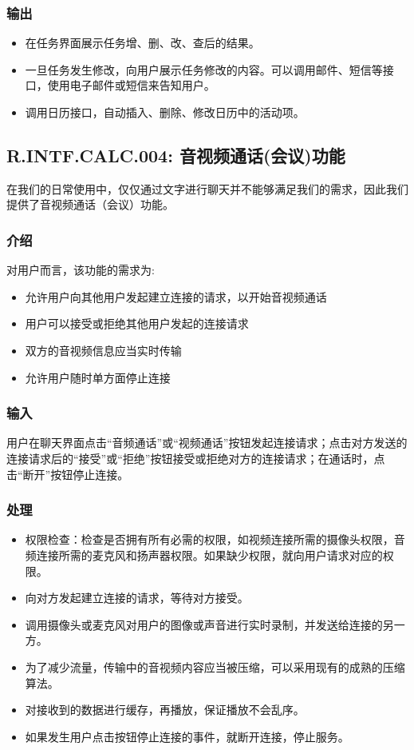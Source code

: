 \subsubsection{输出}
\begin{itemize}
  \item 在任务界面展示任务增、删、改、查后的结果。
  \item 一旦任务发生修改，向用户展示任务修改的内容。可以调用邮件、短信等接口，使用电子邮件或短信来告知用户。
  \item 调用日历接口，自动插入、删除、修改日历中的活动项。
\end{itemize}

\subsection{R.INTF.CALC.004: 音视频通话(会议)功能}
在我们的日常使用中，仅仅通过文字进行聊天并不能够满足我们的需求，因此我们提供了音视频通话（会议）功能。
\subsubsection{介绍}
对用户而言，该功能的需求为:
\begin{itemize}
  \item 允许用户向其他用户发起建立连接的请求，以开始音视频通话
  \item 用户可以接受或拒绝其他用户发起的连接请求
  \item 双方的音视频信息应当实时传输
  \item 允许用户随时单方面停止连接
\end{itemize}
\subsubsection{输入}
用户在聊天界面点击“音频通话”或“视频通话”按钮发起连接请求；点击对方发送的连接请求后的“接受”或“拒绝”按钮接受或拒绝对方的连接请求；在通话时，点击“断开”按钮停止连接。
\subsubsection{处理}
\begin{itemize}
  \item 权限检查：检查是否拥有所有必需的权限，如视频连接所需的摄像头权限，音频连接所需的麦克风和扬声器权限。如果缺少权限，就向用户请求对应的权限。
  \item 向对方发起建立连接的请求，等待对方接受。
  \item 调用摄像头或麦克风对用户的图像或声音进行实时录制，并发送给连接的另一方。
  \item 为了减少流量，传输中的音视频内容应当被压缩，可以采用现有的成熟的压缩算法。
  \item 对接收到的数据进行缓存，再播放，保证播放不会乱序。
  \item 如果发生用户点击按钮停止连接的事件，就断开连接，停止服务。
\end{itemize}
